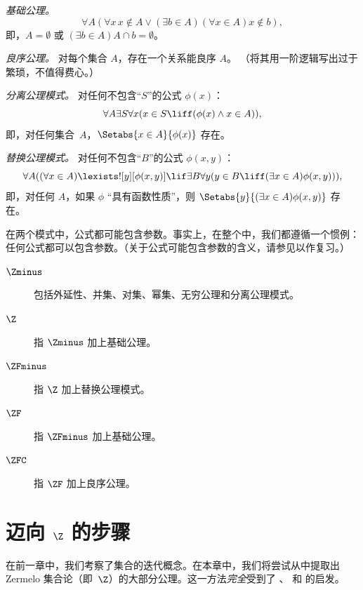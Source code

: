 \begin{defish}
\emph{基础公理。}
\[
\forall A(\forall x\, x \notin A \lor (\exists b \in A)(\forall x \in A)x \notin b),
\]
即，$A = \emptyset$ 或 $(\exists b \in A)A\cap b = \emptyset$。
\end{defish}

\begin{defish}
\emph{良序公理。}
对每个集合 $A$，存在一个关系能良序 $A$。
（将其用一阶逻辑写出过于繁琐，不值得费心。）
\end{defish}

\begin{defish}
\emph{分离公理模式。}
对任何不包含“$S$”的公式 $\phi(x)$：
\[
\forall A \exists S \forall x(x \in S \liff (\phi(x) \land x \in A)),
\]
即，对任何集合~$A$，$\Setabs{x \in A}{\phi(x)}$ 存在。
\end{defish}

\begin{defish}
\emph{替换公理模式。}
对任何不包含“$B$”的公式 $\phi(x, y)$：
\[
\forall A((\forall x \in A)\lexists![y][\phi(x,y)] \lif \exists B \forall y (y \in B \liff (\exists x \in A)\phi(x,y))),
\]
即，对任何 $A$，如果 $\phi$ “具有函数性质”，则 $\Setabs{y}{(\exists x \in A)\phi(x,y)}$ 存在。
\end{defish}

在两个模式中，公式都可能包含参数。事实上，在整个中，我们都遵循一个惯例：任何公式都可以包含参数。（关于公式可能包含参数的含义，请参见以作复习。）

\begin{description}
\item[$\Zminus$] 包括外延性、并集、对集、幂集、无穷公理和分离公理模式。
\item[$\Z$] 指 $\Zminus$ 加上基础公理。
\item[$\ZFminus$] 指 $\Z$ 加上替换公理模式。
\item[$\ZF$] 指 $\ZFminus$ 加上基础公理。
\item[$\ZFC$] 指 $\ZF$ 加上良序公理。
\end{description}


\chapter{迈向 $\Z$ 的步骤}

在前一章中，我们考察了集合的迭代概念。在本章中，我们将尝试从中提取出 Zermelo 集合论（即~$\Z$）的大部分公理。这一方法\emph{完全}受到了 \citet{Boolos1971}、\citet{Scott1974} 和 \citet{Shoenfield:AST} 的启发。

